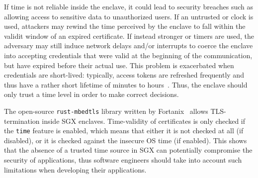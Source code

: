\documentclass[sigplan,10pt]{acmart}
\begin{document}
If time is not reliable inside the enclave, it could lead to security breaches
such as allowing access to sensitive data to unauthorized users.
If an untrusted \Tzero{} or \Tone{} clock is used, attackers may rewind the time perceived by the enclave to fall within the validit window of an expired certificate.
If instead stronger \Ttwo{} or \Tthree{} timers are used, the adversary may still induce network delays and/or interrupts to coerce the enclave into accepting credentials that were valid at the beginning of the communication, but have expired before their actual use. 
This problem is exacerbated when credentials are short-lived: typically, access
tokens are refreshed frequently and thus have a rather short lifetime of minutes
to hours~\cite{rfc6819}. Thus, the enclave should only trust a time level
\Tfour{} in order to make correct decisions.
%

The open-source \texttt{rust-mbedtls} library written by
Fortanix~\cite{rustMbedtls} allows TLS-termination inside SGX enclaves.
Time-validity of certificates is only checked if the \texttt{time} feature is
enabled, which means that either it is not checked at all (if disabled), or it
is checked against the insecure OS time (if enabled). This shows that the
absence of a trusted time source in SGX can potentially compromise the security
of applications, thus software engineers should take into account such
limitations when developing their applications.
%
\end{document}
